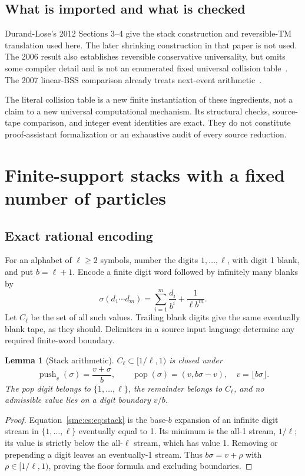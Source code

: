 \documentclass[11pt,letterpaper]{article}
\numberwithin{equation}{section}
\newtheorem{lemma}[theorem]{Lemma}
\theoremstyle{definition}
\theoremstyle{remark}
\newcommand{\sig}{\sigma}\newcommand{\blank}{\mathsf b}
\begin{document}
\subsection{What is imported and what is checked}
Durand-Lose's 2012 Sections 3--4 give the stack construction and reversible-TM translation used here. The later shrinking construction in that paper is not used. The 2006 result also establishes reversible conservative universality, but omits some compiler detail and is not an enumerated fixed universal collision table~\cite{DL06}. The 2007 linear-BSS comparison already treats next-event arithmetic~\cite{DL07}.

The literal collision table is a new finite instantiation of these ingredients, not a claim to a new universal computational mechanism. Its structural checks, source-tape comparison, and integer event identities are exact. They do not constitute proof-assistant formalization or an exhaustive audit of every source reduction.

\section{Finite-support stacks with a fixed number of particles}\label{smc:cs:sec:stack}
\subsection{Exact rational encoding}
For an alphabet of $\ell\ge2$ symbols, number the digits $1,\ldots,\ell$, with digit 1 blank, and put $b=\ell+1$. Encode a finite digit word followed by infinitely many blanks by
\begin{equation}\label{smc:cs:eq:stack}
 \sig(d_1\cdots d_m)
  =\sum_{i=1}^{m}\frac{d_i}{b^i}+\frac{1}{\ell b^m}.
\end{equation}
Let $C_\ell$ be the set of all such values. Trailing blank digits give the same eventually blank tape, as they should. Delimiters in a source input language determine any required finite-word boundary.

\begin{lemma}[Stack arithmetic]\label{smc:cs:lem:stack}
$C_\ell\subset[1/\ell,1)$ is closed under
\[
 \operatorname{push}_v(\sig)=\frac{v+\sig}{b},\qquad
 \operatorname{pop}(\sig)=(v,b\sig-v),\quad v=\lfloor b\sig\rfloor.
\]
The pop digit belongs to $\{1,\ldots,\ell\}$, the remainder belongs to $C_\ell$, and no admissible value lies on a digit boundary $v/b$.
\end{lemma}
\begin{proof}
Equation~\eqref{smc:cs:eq:stack} is the base-$b$ expansion of an infinite digit stream in $\{1,\ldots,\ell\}$ eventually equal to 1. Its minimum is the all-1 stream, $1/\ell$; its value is strictly below the all-$\ell$ stream, which has value 1. Removing or prepending a digit leaves an eventually-1 stream. Thus $b\sig=v+\rho$ with $\rho\in[1/\ell,1)$, proving the floor formula and excluding boundaries.
\end{proof}
\end{document}
